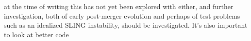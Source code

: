 at the time of writing this has not yet been explored with either, and further investigation, both of early post-merger evolution and perhaps of test problems such as an idealized SLING instability, should be investigated.  It's also important to look at better code






